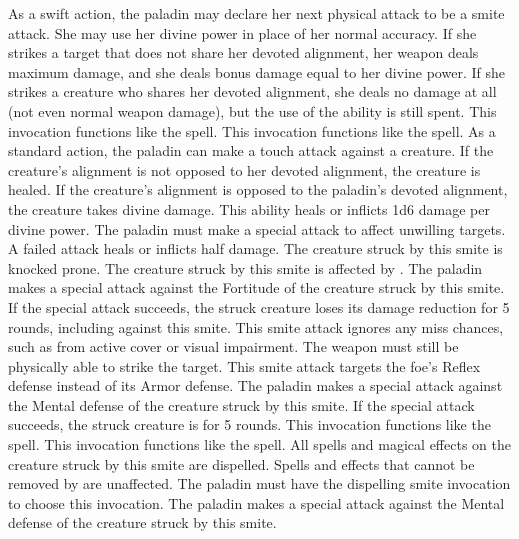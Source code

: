 As a swift action, the paladin may declare her next physical attack to be a smite attack.
She may use her divine power in place of her normal accuracy.
If she strikes a target that does not share her devoted alignment, her weapon deals maximum damage, and she deals bonus damage equal to her divine power.
If she strikes a creature who shares her devoted alignment, she deals no damage at all (not even normal weapon damage), but the use of the ability is still spent.
 This invocation functions like the  spell.
 This invocation functions like the  spell.
As a standard action, the paladin can make a touch attack against a creature.
If the creature's alignment is not opposed to her devoted alignment, the creature is healed.
If the creature's alignment is opposed to the paladin's devoted alignment, the creature takes divine damage.
This ability heals or inflicts 1d6 damage per divine power.
The paladin must make a special attack to affect unwilling targets.
A failed attack heals or inflicts half damage.
The creature struck by this smite is knocked prone.
The creature struck by this smite is affected by .
The paladin makes a special attack against the Fortitude of the creature struck by this smite.
If the special attack succeeds, the struck creature loses its damage reduction for 5 rounds, including against this smite.
This smite attack ignores any miss chances, such as from active cover or visual impairment.
The weapon must still be physically able to strike the target.
This smite attack targets the foe's Reflex defense instead of its Armor defense.
The paladin makes a special attack against the Mental defense of the creature struck by this smite.
If the special attack succeeds, the struck creature is \dazed for 5 rounds.
 This invocation functions like the  spell.
 This invocation functions like the  spell.
All spells and magical effects on the creature struck by this smite are dispelled.
Spells and effects that cannot be removed by  are unaffected.
The paladin must have the dispelling smite invocation to choose this invocation.
The paladin makes a special attack against the Mental defense of the creature struck by this smite.
